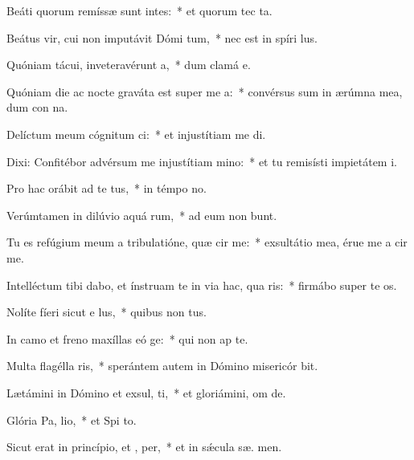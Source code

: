 \item Beáti quorum remíssæ sunt intes:~* et quorum tec  ta.
\item Beátus vir, cui non imputávit Dómi tum,~* nec est in spíri  lus.
\item Quóniam tácui, inveteravérunt  a,~* dum clamá  e.
\item Quóniam die ac nocte graváta est super me  a:~* convérsus sum in ærúmna mea, dum con na.
\item Delíctum meum cógnitum  ci:~* et injustítiam me  di.
\item Dixi: Confitébor advérsum me injustítiam  mino:~* et tu remisísti impietátem  i.
\item Pro hac orábit ad te  tus,~* in témpo no.
\item Verúmtamen in dilúvio aquá rum,~* ad eum non bunt.
\item Tu es refúgium meum a tribulatióne, quæ cir me:~* exsultátio mea, érue me a cir me.
\item Intelléctum tibi dabo, et ínstruam te in via hac, qua ris:~* firmábo super te  os.
\item Nolíte fíeri sicut e  lus,~* quibus non  tus.
\item In camo et freno maxíllas eó ge:~* qui non ap  te.
\item Multa flagélla ris,~* sperántem autem in Dómino misericór bit.
\item Lætámini in Dómino et exsul, ti,~* et gloriámini, om  de.
\item Glória Pa,  lio,~* et Spi to.
\item Sicut erat in princípio, et ,  per,~* et in sǽcula sæ. men.
